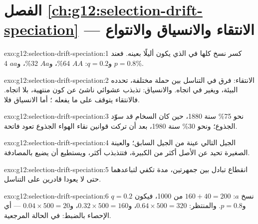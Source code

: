 \section*{الفصل \ref{ch:g12:selection-drift-speciation} --- الانتقاء والانسياق والانتواع}

\begin{solution}{exo:g12:selection-drift-speciation:1}
كسر نسخ  كلها في  الذي يكون أليلًا بعينه. فعند $p = 0.8$
و$q = 0.2$: $AA$ 64\%، و$Aa$ 32\%، و$aa$ 4\%.
\end{solution}

\begin{solution}{exo:g12:selection-drift-speciation:2}
الانتقاء: فرق في التناسل بين حملة  مختلفة، تحدده البيئة، ويغير
 في اتجاه. والانسياق: تذبذب عشوائي  ناشئ عن كون
 منتهية، بلا اتجاه. فالانتقاء يتوقف على ما يفعله ؛ أما
الانسياق فلا.
\end{solution}

\begin{solution}{exo:g12:selection-drift-speciation:3}
نحو 75\% سنة 1880، حين كان السخام قد سوّد الجذوع؛ ونحو 30\% سنة 1980،
بعد أن تركت قوانين نقاء الهواء الجذوع تعود فاتحة.
\end{solution}

\begin{solution}{exo:g12:selection-drift-speciation:4}
 الجيل التالي عينة من  الجيل السابق؛ والعينة الصغيرة تحيد
عن الأصل أكثر من الكبيرة، فتتذبذب  أكثر، ويستطيع  أن يضيع
بالمصادفة.
\end{solution}

\begin{solution}{exo:g12:selection-drift-speciation:5}
انقطاع تبادل  بين جمهرتين، مدة تكفي لتباعدهما حتى لا يعودا
قادرين على التناسل.
\end{solution}

\begin{solution}{exo:g12:selection-drift-speciation:6}
نسخ $a$: $160 + 40 = 200$ من 1000، فيكون $q = 0.2$ و$p = 0.8$.
والمنتظر: $0.64 \times 500 = 320$، و$0.32 \times 500 = 160$، و$0.04
\times 500 = 20$ --- أي الإحصاء بالضبط:  في الحالة
المرجعية.
\end{solution}

